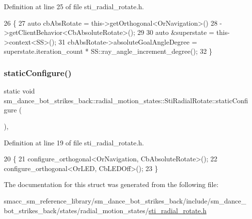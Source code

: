 Definition at line 25 of file sti\+\_\+radial\+\_\+rotate.\+h.


\begin{DoxyCode}
26   \{
27     \textcolor{keyword}{auto} cbAbsRotate = this->getOrthogonal<OrNavigation>()
28                            ->getClientBehavior<CbAbsoluteRotate>();
29 
30     \textcolor{keyword}{auto} &superstate = this->context<SS>();
31     cbAbsRotate->absoluteGoalAngleDegree = superstate.iteration\_count * SS::ray\_angle\_increment\_degree();
32   \}
\end{DoxyCode}
\mbox{\label{structsm__dance__bot__strikes__back_1_1radial__motion__states_1_1StiRadialRotate_af99632e42387e469ee09db280aee4dc2}} 
\subsubsection{\texorpdfstring{static\+Configure()}{staticConfigure()}}
{\footnotesize\ttfamily static void sm\+\_\+dance\+\_\+bot\+\_\+strikes\+\_\+back\+::radial\+\_\+motion\+\_\+states\+::\+Sti\+Radial\+Rotate\+::static\+Configure (\begin{DoxyParamCaption}{ }\end{DoxyParamCaption})\hspace{0.3cm}{\ttfamily [inline]}, {\ttfamily [static]}}



Definition at line 19 of file sti\+\_\+radial\+\_\+rotate.\+h.


\begin{DoxyCode}
20   \{
21     configure\_orthogonal<OrNavigation, CbAbsoluteRotate>();
22     configure\_orthogonal<OrLED, CbLEDOff>();
23   \}
\end{DoxyCode}


The documentation for this struct was generated from the following file\+:\begin{DoxyCompactItemize}
\item 
smacc\+\_\+sm\+\_\+reference\+\_\+library/sm\+\_\+dance\+\_\+bot\+\_\+strikes\+\_\+back/include/sm\+\_\+dance\+\_\+bot\+\_\+strikes\+\_\+back/states/radial\+\_\+motion\+\_\+states/\hyperlink{strikes__back_2include_2sm__dance__bot__strikes__back_2states_2radial__motion__states_2sti__radial__rotate_8h}{sti\+\_\+radial\+\_\+rotate.\+h}\end{DoxyCompactItemize}
